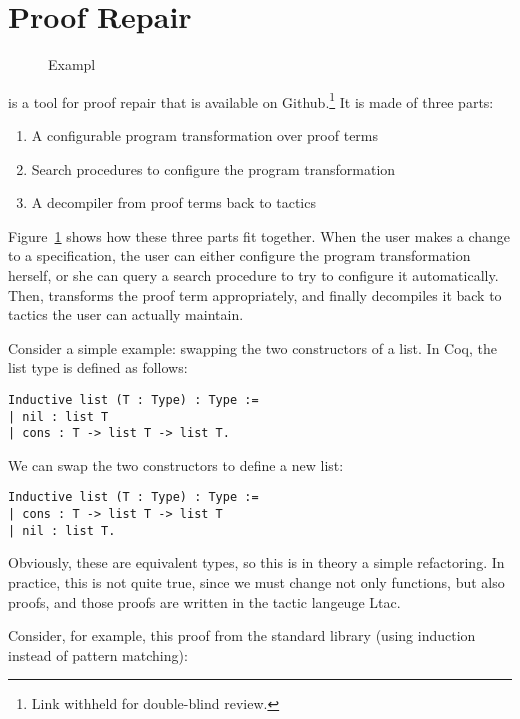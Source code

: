 \section{Proof Repair}
\label{sec:overview}

\begin{figure}
\caption{Exampl}
\label{fig:system}
\end{figure}

\toolname is a tool for proof repair that is available on Github.\footnote{Link withheld for double-blind review.}
It is made of three parts:

\begin{enumerate}
\item A configurable program transformation over proof terms
\item Search procedures to configure the program transformation %
\item A decompiler from proof terms back to tactics
\end{enumerate}
Figure~\ref{fig:system} shows how these three parts fit together.
When the user makes a change to a specification,
the user can either configure the program transformation herself, or she can
query a search procedure to try to configure it automatically.
Then, \toolname transforms the proof term appropriately, and finally
decompiles it back to tactics the user can actually maintain.

Consider a simple example: swapping the two constructors of a list.
In Coq, the list type is defined as follows:

\begin{lstlisting}
Inductive list (T : Type) : Type :=
| nil : list T
| cons : T -> list T -> list T.
\end{lstlisting}
We can swap the two constructors to define a new list: %

\begin{lstlisting}
Inductive list (T : Type) : Type :=
| cons : T -> list T -> list T
| nil : list T.
\end{lstlisting}
Obviously, these are equivalent types, so this is in theory a simple refactoring.
In practice, this is not quite true, since we must change not only functions, but also proofs,
and those proofs are written in the tactic langeuge Ltac.

Consider, for example, this proof from the standard library (using induction instead of pattern matching): %

